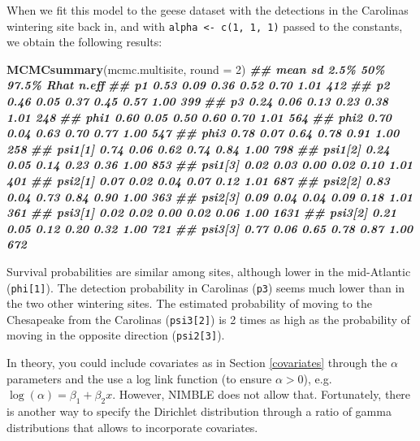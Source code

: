 \documentclass[
  12pt,
]{krantz}
\newenvironment{Shaded}{\begin{snugshade}}{\end{snugshade}}
\newcommand{\AttributeTok}[1]{\textcolor[rgb]{0.13,0.29,0.53}{#1}}
\newcommand{\DecValTok}[1]{\textcolor[rgb]{0.00,0.00,0.81}{#1}}
\newcommand{\DocumentationTok}[1]{\textcolor[rgb]{0.56,0.35,0.01}{\textbf{\textit{#1}}}}
\newcommand{\FunctionTok}[1]{\textcolor[rgb]{0.13,0.29,0.53}{\textbf{#1}}}
\newcommand{\NormalTok}[1]{#1}
\begin{document}
When we fit this model to the geese dataset with the detections in the Carolinas wintering site back in, and with \texttt{alpha\ \textless{}-\ c(1,\ 1,\ 1)} passed to the constants, we obtain the following results:

\begin{Shaded}
\begin{Highlighting}[]
\FunctionTok{MCMCsummary}\NormalTok{(mcmc.multisite, }\AttributeTok{round =} \DecValTok{2}\NormalTok{)}
\DocumentationTok{\#\#         mean   sd 2.5\%  50\% 97.5\% Rhat n.eff}
\DocumentationTok{\#\# p1      0.53 0.09 0.36 0.52  0.70 1.01   412}
\DocumentationTok{\#\# p2      0.46 0.05 0.37 0.45  0.57 1.00   399}
\DocumentationTok{\#\# p3      0.24 0.06 0.13 0.23  0.38 1.01   248}
\DocumentationTok{\#\# phi1    0.60 0.05 0.50 0.60  0.70 1.01   564}
\DocumentationTok{\#\# phi2    0.70 0.04 0.63 0.70  0.77 1.00   547}
\DocumentationTok{\#\# phi3    0.78 0.07 0.64 0.78  0.91 1.00   258}
\DocumentationTok{\#\# psi1[1] 0.74 0.06 0.62 0.74  0.84 1.00   798}
\DocumentationTok{\#\# psi1[2] 0.24 0.05 0.14 0.23  0.36 1.00   853}
\DocumentationTok{\#\# psi1[3] 0.02 0.03 0.00 0.02  0.10 1.01   401}
\DocumentationTok{\#\# psi2[1] 0.07 0.02 0.04 0.07  0.12 1.01   687}
\DocumentationTok{\#\# psi2[2] 0.83 0.04 0.73 0.84  0.90 1.00   363}
\DocumentationTok{\#\# psi2[3] 0.09 0.04 0.04 0.09  0.18 1.01   361}
\DocumentationTok{\#\# psi3[1] 0.02 0.02 0.00 0.02  0.06 1.00  1631}
\DocumentationTok{\#\# psi3[2] 0.21 0.05 0.12 0.20  0.32 1.00   721}
\DocumentationTok{\#\# psi3[3] 0.77 0.06 0.65 0.78  0.87 1.00   672}
\end{Highlighting}
\end{Shaded}

Survival probabilities are similar among sites, although lower in the mid-Atlantic (\texttt{phi{[}1{]}}). The detection probability in Carolinas (\texttt{p3}) seems much lower than in the two other wintering sites. The estimated probability of moving to the Chesapeake from the Carolinas (\texttt{psi3{[}2{]}}) is 2 times as high as the probability of moving in the opposite direction (\texttt{psi2{[}3{]}}).

In theory, you could include covariates as in Section \ref{covariates} through the \(\alpha\) parameters and the use a log link function (to ensure \(\alpha > 0\)), e.g.~\(\log(\alpha) = \beta_1 + \beta_2 x\). However, NIMBLE does not allow that. Fortunately, there is another way to specify the Dirichlet distribution through a ratio of gamma distributions that allows to incorporate covariates.
\end{document}
